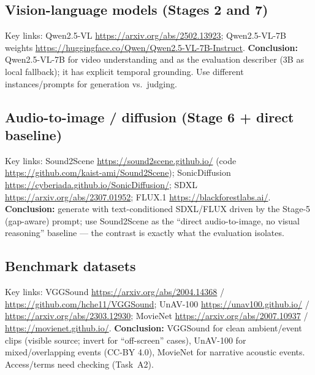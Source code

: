 \documentclass[11pt,a4paper]{article}
\begin{document}
\subsection*{Vision-language models (Stages 2 and 7)}
Key links: Qwen2.5-VL \url{https://arxiv.org/abs/2502.13923}; Qwen2.5-VL-7B weights
\url{https://huggingface.co/Qwen/Qwen2.5-VL-7B-Instruct}.
\textbf{Conclusion:} Qwen2.5-VL-7B for video understanding and as the evaluation describer (3B as
local fallback); it has explicit temporal grounding. Use different instances/prompts for generation
vs.\ judging.

\subsection*{Audio-to-image / diffusion (Stage 6 + direct baseline)}
Key links: Sound2Scene \url{https://sound2scene.github.io/} (code
\url{https://github.com/kaist-ami/Sound2Scene}); SonicDiffusion
\url{https://cyberiada.github.io/SonicDiffusion/}; SDXL \url{https://arxiv.org/abs/2307.01952};
FLUX.1 \url{https://blackforestlabs.ai/}.
\textbf{Conclusion:} generate with text-conditioned SDXL/FLUX driven by the Stage-5 (gap-aware)
prompt; use Sound2Scene as the ``direct audio-to-image, no visual reasoning'' baseline --- the
contrast is exactly what the evaluation isolates.

\subsection*{Benchmark datasets}
Key links: VGGSound \url{https://arxiv.org/abs/2004.14368} / \url{https://github.com/hche11/VGGSound};
UnAV-100 \url{https://unav100.github.io/} / \url{https://arxiv.org/abs/2303.12930}; MovieNet
\url{https://arxiv.org/abs/2007.10937} / \url{https://movienet.github.io/}.
\textbf{Conclusion:} VGGSound for clean ambient/event clips (visible source; invert for
``off-screen'' cases), UnAV-100 for mixed/overlapping events (CC-BY 4.0), MovieNet for narrative
acoustic events. Access/terms need checking (Task~A2).
\end{document}
